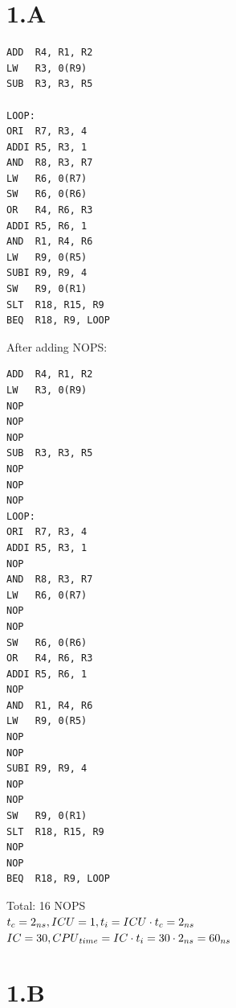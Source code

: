 \documentclass{article}
\begin{document}
\section*{1.A}
\begin{lstlisting}[language={[x86masm]Assembler}, caption=Original code]
ADD  R4, R1, R2
LW   R3, 0(R9)
SUB  R3, R3, R5

LOOP:
ORI  R7, R3, 4
ADDI R5, R3, 1
AND  R8, R3, R7
LW   R6, 0(R7)
SW   R6, 0(R6)
OR   R4, R6, R3
ADDI R5, R6, 1
AND  R1, R4, R6
LW   R9, 0(R5)
SUBI R9, R9, 4
SW   R9, 0(R1)
SLT  R18, R15, R9
BEQ  R18, R9, LOOP
\end{lstlisting}
After adding NOPS:
\begin{lstlisting}[language={[x86masm]Assembler}, caption=Code with NOPS]
ADD  R4, R1, R2
LW   R3, 0(R9)
NOP
NOP
NOP
SUB  R3, R3, R5
NOP
NOP
NOP
LOOP:
ORI  R7, R3, 4
ADDI R5, R3, 1
NOP
AND  R8, R3, R7
LW   R6, 0(R7)
NOP
NOP
SW   R6, 0(R6)
OR   R4, R6, R3
ADDI R5, R6, 1
NOP
AND  R1, R4, R6
LW   R9, 0(R5)
NOP
NOP
SUBI R9, R9, 4
NOP
NOP
SW   R9, 0(R1)
SLT  R18, R15, R9
NOP
NOP
BEQ  R18, R9, LOOP
\end{lstlisting}
Total: 16 NOPS\\
$t_c=2_{ns},ICU=1,t_i=ICU\cdot t_c=2_{ns}$\\
$IC=30,{CPU}_{time}=IC\cdot t_i=30\cdot2_{ns}=60_{ns}$\\
\section*{1.B}
\end{document}
